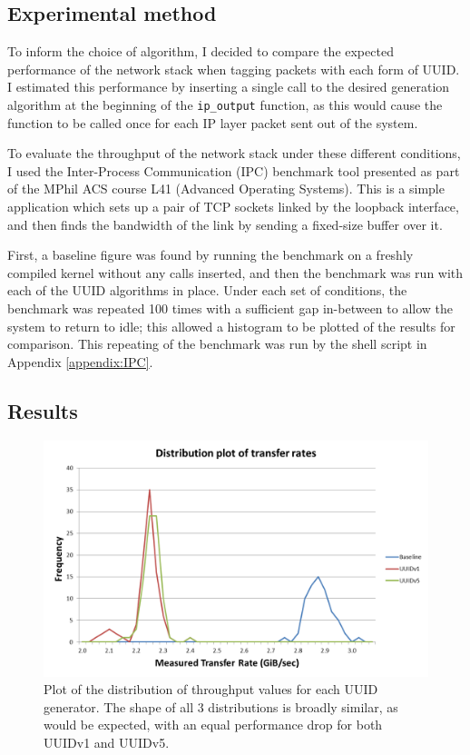 \documentclass[a4paper,12pt,twoside,openright]{report}
\begin{document}
	\subsection{Experimental method}
	
	To inform the choice of algorithm, I decided to compare the expected performance of the network stack when tagging packets with each form of UUID. I estimated this performance by inserting a single call to the desired generation algorithm at the beginning of the \verb|ip_output| function, as this would cause the function to be called once for each IP layer packet sent out of the system.
	
	To evaluate the throughput of the network stack under these different conditions, I used the Inter-Process Communication (IPC) benchmark tool presented as part of the MPhil ACS course L41 (Advanced Operating Systems). This is a simple application which sets up a pair of TCP sockets linked by the loopback interface, and then finds the bandwidth of the link by sending a fixed-size buffer over it.
	
	First, a baseline figure was found by running the benchmark on a freshly compiled kernel without any calls inserted, and then the benchmark was run with each of the UUID algorithms in place. Under each set of conditions, the benchmark was repeated 100 times with a sufficient gap in-between to allow the system to return to idle; this allowed a histogram to be plotted of the results for comparison. This repeating of the benchmark was run by the shell script in Appendix \ref{appendix:IPC}.
	
	\subsection{Results}
	
	\begin{figure}
		\includegraphics[width=\linewidth]{include/IPC-uuid-bench.png}
		\caption{Plot of the distribution of throughput values for each UUID generator. The shape of all 3 distributions is broadly similar, as would be expected, with an equal performance drop for both UUIDv1 and UUIDv5.}
		\label{fig:IPC-uuid-bench}
	\end{figure}
	
\end{document}
